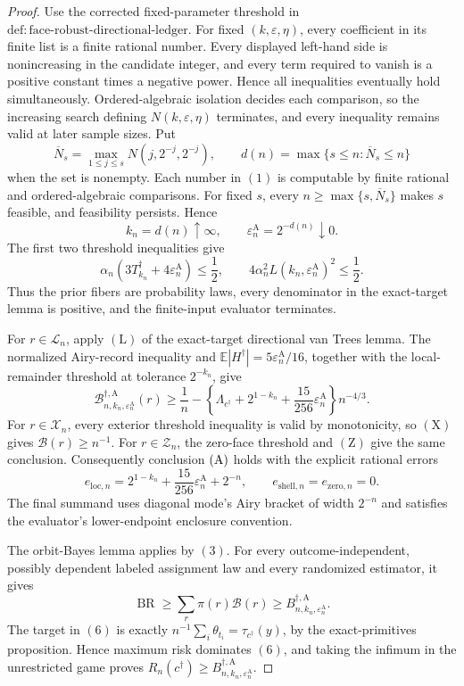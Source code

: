 \documentclass{article}
\begin{document}
\begin{proof}
Use the corrected fixed-parameter threshold in
\(\mathrm{def:face\text{-}robust\text{-}directional\text{-}ledger}\).  For fixed
\((k,\varepsilon,\eta)\), every coefficient in its finite list is a finite rational number.  Every displayed left-hand side is nonincreasing in the candidate integer, and every term required to vanish is a positive constant times a negative power.  Hence all inequalities eventually hold simultaneously.  Ordered-algebraic isolation decides each comparison, so the increasing search defining \(N(k,\varepsilon,\eta)\) terminates, and every inequality remains valid at later sample sizes.  Put
\[
\overline N_s=\max_{1\le j\le s}N(j,2^{-j},2^{-j}),
\qquad
d(n)=\max\{s\le n:\overline N_s\le n\}
\tag{1}
\]
when the set is nonempty.  Each number in \((1)\) is computable by finite rational and ordered-algebraic comparisons.  For fixed \(s\), every
\(n\ge\max\{s,\overline N_s\}\) makes \(s\) feasible, and feasibility persists.  Hence
\[
k_n=d(n)\uparrow\infty,\qquad
\varepsilon_n^{\mathrm A}=2^{-d(n)}\downarrow0.
\tag{2}
\]
The first two threshold inequalities give
\[
\alpha_n(3T_{k_n}^\dagger+4\varepsilon_n^{\mathrm A})\le\frac12,
\qquad
4\alpha_n^2L(k_n,\varepsilon_n^{\mathrm A})^2\le\frac12.
\tag{3}
\]
Thus the prior fibers are probability laws, every denominator in the exact-target lemma is positive, and the finite-input evaluator terminates.

For \(r\in\mathcal L_n\), apply \((\mathrm L)\) of the exact-target directional van Trees lemma.  The normalized Airy-record inequality and
\(\mathbb E|H^\dagger|=5\varepsilon_n^{\mathrm A}/16\), together with the local-remainder threshold at tolerance \(2^{-k_n}\), give
\[
\mathcal B_{n,k_n,\varepsilon_n^{\mathrm A}}^{\dagger,\mathrm A}(r)
\ge\frac1n-
\left\{\Lambda_{c^\dagger}+2^{1-k_n}
+\frac{15}{256}\varepsilon_n^{\mathrm A}\right\}n^{-4/3}.
\tag{4}
\]
For \(r\in\mathcal X_n\), every exterior threshold inequality is valid by monotonicity, so \((\mathrm X)\) gives
\(\mathcal B(r)\ge n^{-1}\).  For \(r\in\mathcal Z_n\), the zero-face threshold and \((\mathrm Z)\) give the same conclusion.  Consequently conclusion \({\rm(A)}\) holds with the explicit rational errors
\[
e_{\mathrm{loc},n}=2^{1-k_n}+\frac{15}{256}\varepsilon_n^{\mathrm A}+2^{-n},
\qquad e_{\mathrm{shell},n}=e_{\mathrm{zero},n}=0.
\tag{5}
\]
The final summand uses diagonal mode's Airy bracket of width \(2^{-n}\) and satisfies the evaluator's lower-endpoint enclosure convention.

The orbit-Bayes lemma applies by \((3)\).  For every outcome-independent, possibly dependent labeled assignment law and every randomized estimator, it gives
\[
\operatorname{BR}\ge\sum_r\pi(r)\mathcal B(r)
\ge B_{n,k_n,\varepsilon_n^{\mathrm A}}^{\dagger,\mathrm A}.
\tag{6}
\]
The target in \((6)\) is exactly
\(n^{-1}\sum_i\theta_{t_i}=\tau_{c^\dagger}(y)\), by the exact-primitives proposition.  Hence maximum risk dominates \((6)\), and taking the infimum in the unrestricted game proves
\(R_n(c^\dagger)\ge B_{n,k_n,\varepsilon_n^{\mathrm A}}^{\dagger,\mathrm A}\).


\end{proof}
\end{document}
